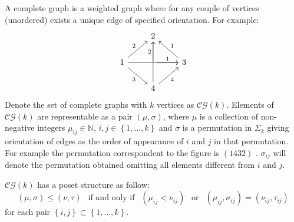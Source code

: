 	\begin{remark}
		A complete graph is a weighted graph where for any couple of vertices (unordered) exists a unique edge of specified orientation.  For example:
\begin{equation*}
	\begin{tikzcd}
		\ & 2 & \  \\
		1 \arrow[ur,"2"] \arrow[rr] \arrow[dr,"3"']& \arrow[r,"1"] \arrow[u,"2"] & 3 \arrow[ul,"1"']  \\
		\ & 4 \arrow[ur,"4"'] \arrow[uu] & \
	\end{tikzcd}
\end{equation*}
Denote the set of complete graphs with $k$ vertices as $\mathcal{CG}(k)$.
Elements of $\mathcal{CG}(k)$ are representable as a pair $(\mu,\sigma)$, where $\mu$ is a collection of non-negative integers $\mu_{ij}\in\mathbb{N}$, $i,j\in \left\lbrace 1,\dots, k \right\rbrace $
  and $\sigma$ is a permutation in $\Sigma_{k}$ giving orientation of edges as the order of appearance of $i$ and $j$ in that permutation.
For example the permutation correspondent to the figure is $(1432)$ .
$\sigma_{ij}$ will denote the permutation obtained omitting all elements different from $i$ and $j$.
	\end{remark}

\begin{remark}
	$\mathcal{CG}(k)$ has a poset structure as follow: 
	\begin{equation*}
		(\mu,\sigma)\le (\nu,\tau) \ \ \text{ if and only if } \ \ (\mu_{ij}<\nu_{ij}) \ \ \text{ or } \ \ (\mu_{ij},\sigma_{ij})= (\nu_{ij},\tau_{ij}) 
	\end{equation*}
	for each pair $\left\lbrace i,j\right\rbrace \subset\left\lbrace 1,\dots,k  \right\rbrace $.
\end{remark}	


